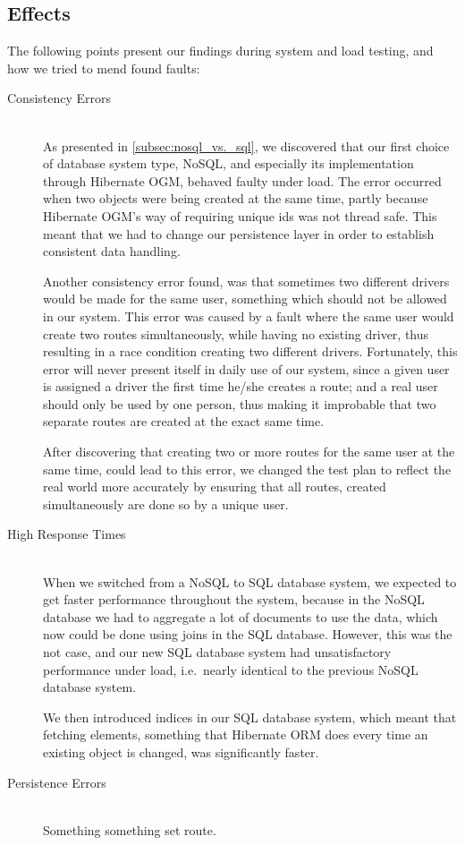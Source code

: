 \subsection{Effects}
The following points present our findings during system and load testing, and how we tried to mend found faults:
\begin{description}
    \item[Consistency Errors]\hfill \\
        As presented in \cref{subsec:nosql_vs._sql}, we discovered that our first choice of database system type, NoSQL, and especially its implementation through Hibernate OGM, behaved faulty under load.
        The error occurred when two objects were being created at the same time, partly because Hibernate OGM's way of requiring unique ids was not thread safe.
        This meant that we had to change our persistence layer in order to establish consistent data handling.

        Another consistency error found, was that sometimes two different drivers would be made for the same user, something which should not be allowed in our system.
        This error was caused by a fault where the same user would create two routes simultaneously, while having no existing driver, thus resulting in a race condition creating two different drivers.
        Fortunately, this error will never present itself in daily use of our system, since a given user is assigned a driver the first time he/she creates a route;
        and a real user should only be used by one person, thus making it improbable that two separate routes are created at the exact same time.

        After discovering that creating two or more routes for the same user at the same time, could lead to this error, we changed the test plan to reflect the real world more accurately by ensuring that all routes, created simultaneously are done so by a unique user.
    \item[High Response Times]\hfill \\
        When we switched from a NoSQL to SQL database system, we expected to get faster performance throughout the system, because in the NoSQL database we had to aggregate a lot of documents to use the data, which now could be done using joins in the SQL database.
        However, this was the not case, and our new SQL database system had unsatisfactory performance under load, i.e.~nearly identical to the previous NoSQL database system.

        We then introduced indices in our SQL database system, which meant that fetching elements, something that Hibernate ORM does every time an existing object is changed, was significantly faster.
    \item[Persistence Errors]\hfill \\
        Something something set route.
\end{description}
